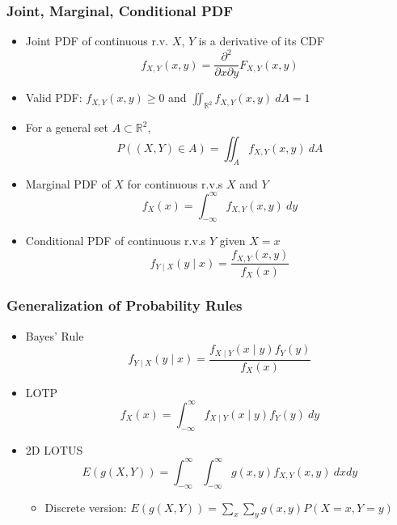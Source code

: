 \subsubsection*{Joint, Marginal, Conditional PDF}
\begin{itemize}
    \item Joint PDF of continuous r.v. $X$, $Y$ is a derivative of its CDF
    \begin{equation}
        f_{X,Y}(x,y)=\frac{\partial^2}{\partial x\partial y}F_{X,Y}(x,y)
    \end{equation}
    \item Valid PDF: $f_{X,Y}(x,y)\geq 0$ and $\iint_{\mathbb{R}^2}f_{X,Y}(x,y)~dA=1$
    \item For a general set $A\subset\mathbb{R}^2$,
    \begin{equation}
        P((X,Y)\in A)=\iint_Af_{X,Y}(x,y)~dA
    \end{equation}
    \item Marginal PDF of $X$ for continuous r.v.s $X$ and $Y$
    \begin{equation}
        f_X(x)=\int_{-\infty}^{\infty}f_{X,Y}(x,y)~dy
    \end{equation}
    \item Conditional PDF of continuous r.v.s $Y$ given $X=x$
    \begin{equation}
        f_{Y\mid X}(y\mid x)=\frac{f_{X,Y}(x,y)}{f_X(x)}
    \end{equation}
\end{itemize}

\subsubsection*{Generalization of Probability Rules}
\begin{itemize}
    \item Bayes' Rule
    \begin{equation}
        f_{Y\mid X}(y\mid x)=\frac{f_{X\mid Y}(x\mid y)f_Y(y)}{f_X(x)}
    \end{equation}
    \item LOTP
    \begin{equation}
        f_X(x)=\int_{-\infty}^{\infty}f_{X\mid Y}(x\mid y)f_Y(y)~dy
    \end{equation}
    \item 2D LOTUS
    \begin{equation}
        E(g(X,Y))=\int_{-\infty}^\infty\int_{-\infty}^\infty g(x,y)f_{X,Y}(x,y)~dxdy
    \end{equation}
    \begin{itemize}
        \item Discrete version: $E(g(X,Y))=\sum_x\sum_yg(x,y)P(X=x,Y=y)$
    \end{itemize}
\end{itemize}

